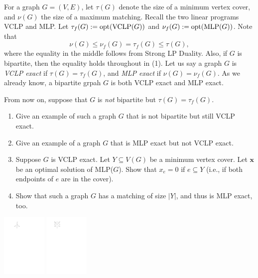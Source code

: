 



    \begin{thm}{}{}
        For a graph $G = (V, E)$, let $\tau(G)$ denote the size of a minimum vertex cover, and $\nu(G)$ the size of a maximum matching. Recall the two linear programs VCLP and MLP. Let $\tau_f(G) := {\rm opt}({\rm VCLP}(G))$ and $\nu_f(G) := {\rm opt}({\rm MLP}(G))$. Note that
        $$
        \nu(G) \leq \nu_f(G) = \tau_f(G) \leq \tau(G),
        $$
        where the equality in the middle follows from Strong LP Duality. Also, if $G$ is bipartite, then the equality holds throughout in (1). Let us say a graph $G$ is {\it VCLP exact} if $\tau(G) = \tau_f(G)$, and {\it MLP exact} if $\nu(G) = \nu_f(G)$. As we already know, a bipartite grpah $G$ is both VCLP exact and MLP exact.
        
        From now on, suppose that $G$ is {\it not} bipartite but $\tau(G) = \tau_f(G)$.
        
        \begin{enumerate}
            \item Give an example of such a graph $G$ that is not bipartite but still VCLP exact.
            \item Give an example of a graph $G$ that is MLP exact but not VCLP exact.
            \item Suppose $G$ is VCLP exact. Let $Y \subseteq V(G)$ be a minimum vertex cover. Let $\mathbf{x}$ be an optimal solution of MLP($G$). Show that $x_e = 0$ if $e \subseteq Y$ (i.e., if both endpoints of $e$ are in the cover).
            \item Show that such a graph $G$ has a matching of size $|Y|$, and thus is MLP exact, too.
        \end{enumerate}
    \end{thm}

    \begin{center}
        \includegraphics[width=0.16\textwidth]{figure4_1.pdf}
        \hspace{3cm}
        \includegraphics[width=0.16\textwidth]{figure4_2.pdf}
    \end{center}

